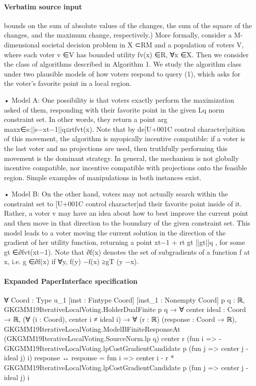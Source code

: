 \documentclass[10pt]{article}
\begin{document}
\paragraph{Verbatim source input}
\begin{ReviewVerbatim}
bounds on the sum of absolute values of the changes, the sum of the square of the changes,
and the maximum change, respectively.)
More formally, consider a M-dimensional societal decision problem in X ⊂RM and a
population of voters V, where each voter v ∈V has bounded utility fv(x) ∈R, ∀x ∈X.
Then we consider the class of algorithms described in Algorithm 1. We study the algorithm
class under two plausible models of how voters respond to query (1), which asks for the
voter's favorite point in a local region.

• Model A:
One possibility is that voters exactly perform the maximization asked of
them, responding with their favorite point in the given Lq norm constraint set. In other
words, they return a point arg maxx∈{s:||s−xt−1||q≤rt}fvt(x). Note that by de[U+001C control character]nition of this
movement, the algorithm is myopically incentive compatible: if a voter is the last voter
and no projections are used, then truthfully performing this movement is the dominant
strategy. In general, the mechanism is not globally incentive compatible, nor incentive
compatible with projections onto the feasible region. Simple examples of manipulations
in both instances exist.

• Model B: On the other hand, voters may not actually search within the constraint set
to [U+001C control character]nd their favorite point inside of it. Rather, a voter v may have an idea about how
to best improve the current point and then move in that direction to the boundary of
the given constraint set. This model leads to a voter moving the current solution in the
direction of the gradient of her utility function, returning a point xt−1 + rt
gt
||gt||q , for some
gt ∈∂fvt(xt−1). Note that ∂f(x) denotes the set of subgradients of a function f at x, i.e.
g ∈∂f(x) if ∀y, f(y) −f(x) ≥gT (y −x).
\end{ReviewVerbatim}


\paragraph{Expanded PaperInterface specification}
\begin{ReviewVerbatim}
∀ {Coord : Type u_1} [inst : Fintype Coord] [inst_1 : Nonempty Coord] {p q : ℝ},
  GKGMM19IterativeLocalVoting.HolderDualFinite p q →
    ∀ {center ideal : Coord → ℝ},
      (∀ (i : Coord), center i ≠ ideal i) →
        ∀ (r : ℝ) (response : Coord → ℝ),
          GKGMM19IterativeLocalVoting.ModelBFiniteResponseAt (GKGMM19IterativeLocalVoting.SourceNorm.lp q) center r
              (fun i => -GKGMM19IterativeLocalVoting.lpCostGradientCandidate p (fun j => center j - ideal j) i)
              response ↔
            response = fun i =>
              center i - r * GKGMM19IterativeLocalVoting.lpCostGradientCandidate p (fun j => center j - ideal j) i
\end{ReviewVerbatim}
\end{document}
